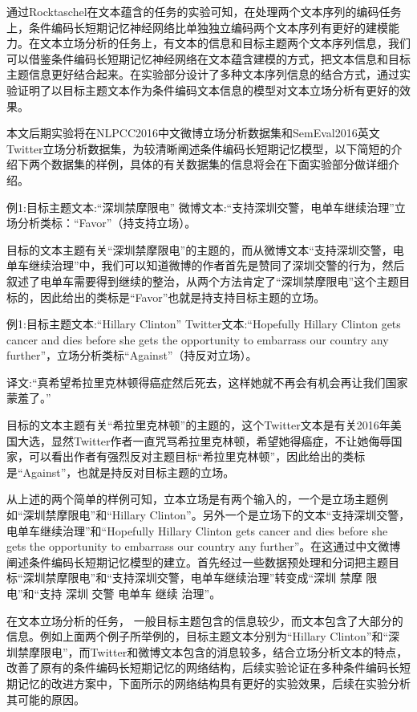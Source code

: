 
通过Rocktaschel在文本蕴含的任务的实验可知，在处理两个文本序列的编码任务上，条件编码长短期记忆神经网络比单独独立编码两个文本序列有更好的建模能力。在文本立场分析的任务上，有文本的信息和目标主题两个文本序列信息，我们可以借鉴条件编码长短期记忆神经网络在文本蕴含建模的方式，把文本信息和目标主题信息更好结合起来。在实验部分设计了多种文本序列信息的结合方式，通过实验证明了以目标主题文本作为条件编码文本信息的模型对文本立场分析有更好的效果。

本文后期实验将在NLPCC2016中文微博立场分析数据集和SemEval2016英文Twitter立场分析数据集，为较清晰阐述条件编码长短期记忆模型，以下简短的介绍下两个数据集的样例，具体的有关数据集的信息将会在下面实验部分做详细介绍。

例1:目标主题文本:“深圳禁摩限电” 微博文本:“支持深圳交警，电单车继续治理”立场分析类标：“Favor”（持支持立场）。

目标的文本主题有关“深圳禁摩限电”的主题的，而从微博文本“支持深圳交警，电单车继续治理”中，我们可以知道微博的作者首先是赞同了深圳交警的行为，然后叙述了电单车需要得到继续的整治，从两个方法肯定了“深圳禁摩限电”这个主题目标的，因此给出的类标是“Favor”也就是持支持目标主题的立场。

例1:目标主题文本:“Hillary Clinton” Twitter文本:“Hopefully Hillary Clinton gets cancer and dies before she gets the opportunity to embarrass our country any further”，立场分析类标“Against”（持反对立场）。

译文:“真希望希拉里克林顿得癌症然后死去，这样她就不再会有机会再让我们国家蒙羞了。”

目标的文本主题有关“希拉里克林顿”的主题的，这个Twitter文本是有关2016年美国大选，显然Twitter作者一直咒骂希拉里克林顿，希望她得癌症，不让她侮辱国家，可以看出作者有强烈反对主题目标“希拉里克林顿”，因此给出的类标是“Against”，也就是持反对目标主题的立场。

从上述的两个简单的样例可知，立本立场是有两个输入的，一个是立场主题例如“深圳禁摩限电”和“Hillary Clinton”。另外一个是立场下的文本“支持深圳交警，电单车继续治理”和“Hopefully Hillary Clinton gets cancer and dies before she gets the opportunity to embarrass our country any further”。在这通过中文微博阐述条件编码长短期记忆模型的建立。首先经过一些数据预处理和分词把主题目标“深圳禁摩限电”和“支持深圳交警，电单车继续治理”转变成“深圳 禁摩 限电”和“支持 深圳 交警 电单车 继续 治理”。

在文本立场分析的任务， 一般目标主题包含的信息较少，而文本包含了大部分的信息。例如上面两个例子所举例的，目标主题文本分别为“Hillary Clinton”和“深圳禁摩限电”，而Twitter和微博文本包含的消息较多，结合立场分析文本的特点，改善了原有的条件编码长短期记忆的网络结构，后续实验论证在多种条件编码长短期记忆的改进方案中，下面所示的网络结构具有更好的实验效果，后续在实验分析其可能的原因。

